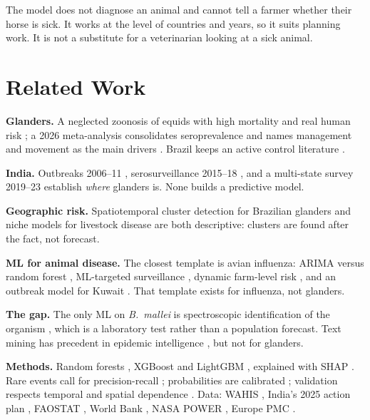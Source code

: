 \documentclass[10pt]{article}
\begin{document}
The model does not diagnose an animal and cannot tell a farmer whether their horse is
sick. It works at the level of countries and years, so it suits planning work. It is not
a substitute for a veterinarian looking at a sick animal.


\section{Related Work}
\label{sec:related}

\textbf{Glanders.} A neglected zoonosis of equids with high mortality and real human risk
\cite{khan2013,kanani2026}; a 2026 meta-analysis consolidates seroprevalence and names
management and movement as the main drivers \cite{purnama2026}. Brazil keeps an active
control literature \cite{mota2022}.

\textbf{India.} Outbreaks 2006--11 \cite{malik2012}, serosurveillance 2015--18
\cite{singha2020}, and a multi-state survey 2019--23 \cite{singha2026} establish
\emph{where} glanders is. None builds a predictive model.

\textbf{Geographic risk.} Spatiotemporal cluster detection for Brazilian glanders
\cite{fonseca2019} and niche models for livestock disease \cite{hollings2017} are both
descriptive: clusters are found after the fact, not forecast.

\textbf{ML for animal disease.} The closest template is avian influenza: ARIMA versus
random forest \cite{kane2014}, ML-targeted surveillance \cite{walsh2019}, dynamic farm-level
risk \cite{yoo2022}, and an outbreak model for Kuwait \cite{alshatti2026}. That template
exists for influenza, not glanders.

\textbf{The gap.} The only ML on \emph{B.\ mallei} is spectroscopic identification of the
organism \cite{moawad2019,stoeckel2015}, which is a laboratory test rather than a population
forecast.
Text mining has precedent in epidemic intelligence \cite{collier2012,lejeune2015}, but not
for glanders.

\textbf{Methods.} Random forests \cite{breiman2001}, XGBoost \cite{chen2016} and LightGBM
\cite{ke2017}, explained with SHAP \cite{lundberg2017}. Rare events call for
precision-recall \cite{saito2015,davis2006}; probabilities are calibrated
\cite{niculescu2005,huang2020}; validation respects temporal and spatial dependence
\cite{roberts2017}. Data: WAHIS \cite{wahis}, India's 2025 action plan \cite{dahd2025},
FAOSTAT \cite{faostat}, World Bank \cite{wdi}, NASA POWER \cite{power}, Europe PMC
\cite{europepmc}.
\end{document}
